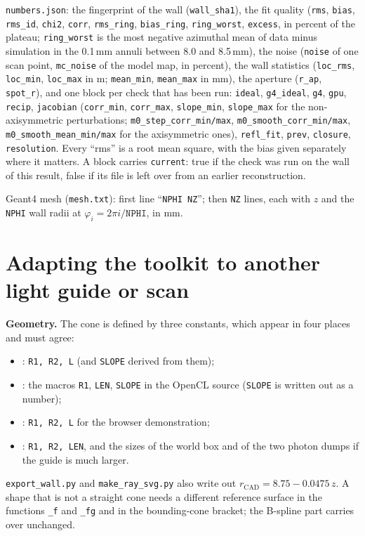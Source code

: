 \documentclass[11pt,a4paper]{article}
\newcommand{\code}[1]{\texttt{#1}}
\begin{document}
\code{numbers.json}: the fingerprint of the wall (\code{wall\_sha1}), the fit quality (\code{rms},
\code{bias}, \code{rms\_id}, \code{chi2}, \code{corr}, \code{rms\_ring}, \code{bias\_ring},
\code{ring\_worst}, \code{excess}, in percent of the plateau; \code{ring\_worst} is the most negative
azimuthal mean of data minus simulation in the 0.1\,mm annuli between 8.0 and 8.5\,mm), the noise (\code{noise} of one scan point, \code{mc\_noise}
of the model map, in percent), the wall statistics (\code{loc\_rms}, \code{loc\_min}, \code{loc\_max}
in \textmu m; \code{mean\_min}, \code{mean\_max} in mm), the aperture (\code{r\_ap}, \code{spot\_r}),
and one block per check that has been run: \code{ideal}, \code{g4\_ideal}, \code{g4}, \code{gpu},
\code{recip}, \code{jacobian} (\code{corr\_min}, \code{corr\_max}, \code{slope\_min}, \code{slope\_max}
for the non-axisymmetric perturbations; \code{m0\_step\_corr\_min/max}, \code{m0\_smooth\_corr\_min/max},
\code{m0\_smooth\_mean\_min/max} for the axisymmetric ones), \code{refl\_fit}, \code{prev},
\code{closure}, \code{resolution}. Every ``rms'' is a root mean
square, with the bias given separately where it matters. A block carries \code{current}: true if the
check was run on the wall of this result, false if its file is left over from an earlier
reconstruction.

Geant4 mesh (\code{mesh.txt}): first line ``\code{NPHI NZ}''; then \code{NZ} lines, each with $z$ and
the \code{NPHI} wall radii at $\varphi_i=2\pi i/\code{NPHI}$, in mm.

\section{Adapting the toolkit to another light guide or scan}
\label{sec:adapt}

\textbf{Geometry.} The cone is defined by three constants, which appear in four places and must agree:
\begin{itemize}
\item {}: \code{R1, R2, L} (and \code{SLOPE} derived from them);
\item {}: the macros \code{R1}, \code{LEN}, \code{SLOPE} in the OpenCL source
(\code{SLOPE} is written out as a number);
\item {}: \code{R1, R2, L} for the browser demonstration;
\item {}: \code{R1, R2, LEN}, and the sizes of the world box and of the two photon
dumps if the guide is much larger.
\end{itemize}
\code{export\_wall.py} and \code{make\_ray\_svg.py} also write out $r_\mathrm{CAD}=8.75-0.0475\,z$.
A shape that is not a straight cone needs a different reference surface in the functions \code{\_f}
and \code{\_fg} and in the bounding-cone bracket; the B-spline part carries over unchanged.
\end{document}
